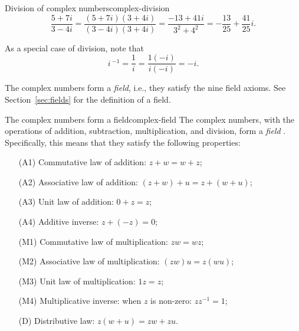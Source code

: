 \begin{example}{Division of complex numbers}{complex-division}
  \begin{equation*}
    \frac{5+7i}{3-4i}
    = \frac{(5+7i)(3+4i)}{(3-4i)(3+4i)}
    = \frac{-13+41i}{3^2+4^2}
    = -\frac{13}{25} + \frac{41}{25}i.
  \end{equation*}
\end{example}

As a special case of division, note that
\begin{equation*}
  i\,^{-1} = \frac{1}{i} = \frac{1(-i)}{i(-i)} = -i.
\end{equation*}

The complex numbers form a {\em field}, i.e., they satisfy the nine
field axioms. See Section~\ref{sec:fields} for the definition of a
field.

\begin{proposition}{The complex numbers form a field}{complex-field}
  The complex numbers, with the operations of addition, subtraction,
  multiplication, and division, form a {\em field}%
  . Specifically,
  this means that they satisfy the following properties:
  \begin{itemize}
  \item[(A1)] {Commutative law of addition:} $z+w=w+z$;
  \item[(A2)] {Associative law of addition:} $(z+w)+u = z+(w+u)$;
  \item[(A3)] {Unit law of addition:} $0+z = z$;
  \item[(A4)] {Additive inverse:} $z+(-z)=0$;
  \item[(M1)] {Commutative law of multiplication:} $zw=wz$;
  \item[(M2)] {Associative law of multiplication:} $(zw)u=z(wu)$;
  \item[(M3)] {Unit law of multiplication:} $1z=z$;
  \item[(M4)] {Multiplicative inverse:} when $z$ is non-zero: $zz^{-1}=1$;
  \item[(D)] {Distributive law:} $z(w+u)=zw+zu$.
  \end{itemize}
\end{proposition}

